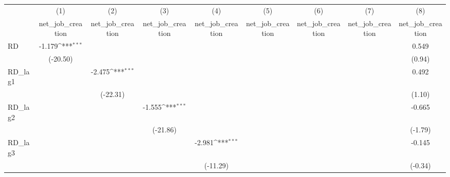 {
\def\sym#1{\ifmmode^{#1}\else\(^{#1}\)\fi}
\begin{tabular}{l*{8}{c}}
\toprule
            &\multicolumn{1}{c}{(1)}&\multicolumn{1}{c}{(2)}&\multicolumn{1}{c}{(3)}&\multicolumn{1}{c}{(4)}&\multicolumn{1}{c}{(5)}&\multicolumn{1}{c}{(6)}&\multicolumn{1}{c}{(7)}&\multicolumn{1}{c}{(8)}\\
            &\multicolumn{1}{c}{net\_job\_creation}&\multicolumn{1}{c}{net\_job\_creation}&\multicolumn{1}{c}{net\_job\_creation}&\multicolumn{1}{c}{net\_job\_creation}&\multicolumn{1}{c}{net\_job\_creation}&\multicolumn{1}{c}{net\_job\_creation}&\multicolumn{1}{c}{net\_job\_creation}&\multicolumn{1}{c}{net\_job\_creation}\\
\midrule
RD          &      -1.179\sym{***}&                     &                     &                     &                     &                     &                     &       0.549         \\
            &    (-20.50)         &                     &                     &                     &                     &                     &                     &      (0.94)         \\
\addlinespace
RD\_lag1     &                     &      -2.475\sym{***}&                     &                     &                     &                     &                     &       0.492         \\
            &                     &    (-22.31)         &                     &                     &                     &                     &                     &      (1.10)         \\
\addlinespace
RD\_lag2     &                     &                     &      -1.555\sym{***}&                     &                     &                     &                     &      -0.665         \\
            &                     &                     &    (-21.86)         &                     &                     &                     &                     &     (-1.79)         \\
\addlinespace
RD\_lag3     &                     &                     &                     &      -2.981\sym{***}&                     &                     &                     &      -0.145         \\
            &                     &                     &                     &    (-11.29)         &                     &                     &                     &     (-0.34)         \\

\end{tabular}}
